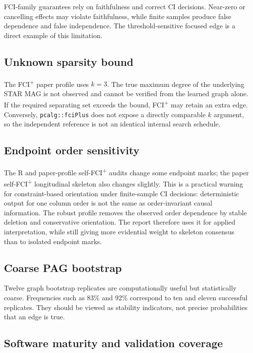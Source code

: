 \documentclass[11pt,a4paper,oneside]{report}
\newcommand{\FCIplus}{FCI\textsuperscript{+}}
\newcommand{\code}[1]{\texttt{#1}}
\begin{document}
FCI-family guarantees rely on faithfulness and correct CI decisions. Near-zero
or cancelling effects may violate faithfulness, while finite samples produce
false dependence and false independence. The threshold-sensitive focused edge
is a direct example of this limitation.

\subsection{Unknown sparsity bound}

The \FCIplus{} paper profile uses \(k=3\). The true maximum degree of the
underlying STAR MAG is not observed and cannot be verified from the learned
graph alone. If the required separating set exceeds the bound, \FCIplus{} may
retain an extra edge. Conversely, \code{pcalg::fciPlus} does not expose a
directly comparable \(k\) argument, so the independent reference is not an
identical internal search schedule.

\subsection{Endpoint order sensitivity}

The R and paper-profile self-\FCIplus{} audits change some endpoint marks; the
paper self-\FCIplus{} longitudinal skeleton also changes slightly. This is a
practical warning for constraint-based orientation under finite-sample CI
decisions: deterministic output for one column order is not the same as
order-invariant causal information. The robust profile removes the observed
order dependence by stable deletion and conservative orientation. The report
therefore uses it for applied interpretation, while still giving more
evidential weight to skeleton consensus than to isolated endpoint marks.

\subsection{Coarse PAG bootstrap}

Twelve graph bootstrap replicates are computationally useful but statistically
coarse. Frequencies such as 83\% and 92\% correspond to ten and eleven
successful replicates. They should be viewed as stability indicators, not
precise probabilities that an edge is true.

\subsection{Software maturity and validation coverage}
\end{document}
